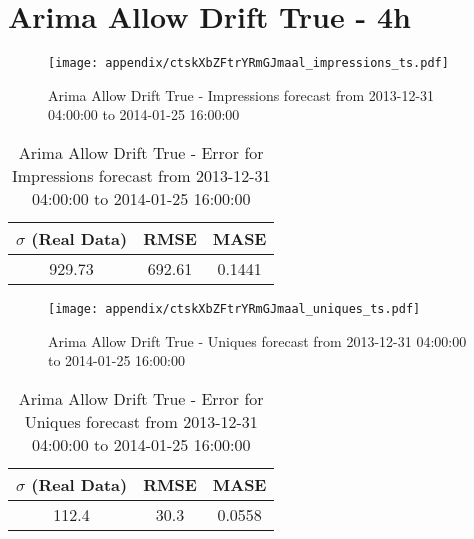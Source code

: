 \section{Arima Allow Drift True - 4h}
\begin{figure}[H] \begin{center} \leavevmode
\texttt{[image: appendix/ctskXbZFtrYRmGJmaal\_impressions\_ts.pdf]} \caption{
Arima Allow Drift True - Impressions forecast from 2013-12-31 04:00:00 to 2014-01-25 16:00:00} \label{fig:appendix/ctskXbZFtrYRmGJmaal_impressions_ts.pdf} \end{center}
\end{figure}

\begin{table}[H]
\centering
\footnotesize
\begin{tabular}{ccc}
$\sigma$ (Real Data) & RMSE & MASE   \\ \hline
929.73 & 692.61 & 0.1441 \\
\end{tabular}

\vspace{0.5cm}

\caption{
Arima Allow Drift True - Error for Impressions forecast from 2013-12-31 04:00:00 to 2014-01-25 16:00:00}
\end{table}

\begin{figure}[H] \begin{center} \leavevmode
\texttt{[image: appendix/ctskXbZFtrYRmGJmaal\_uniques\_ts.pdf]} \caption{
Arima Allow Drift True - Uniques forecast from 2013-12-31 04:00:00 to 2014-01-25 16:00:00} \label{fig:appendix/ctskXbZFtrYRmGJmaal_uniques_ts.pdf} \end{center}
\end{figure}

\begin{table}[H]
\centering
\footnotesize
\begin{tabular}{ccc}
$\sigma$ (Real Data) & RMSE & MASE   \\ \hline
112.4 & 30.3 & 0.0558 \\
\end{tabular}

\vspace{0.5cm}

\caption{
Arima Allow Drift True - Error for Uniques forecast from 2013-12-31 04:00:00 to 2014-01-25 16:00:00}
\end{table}

